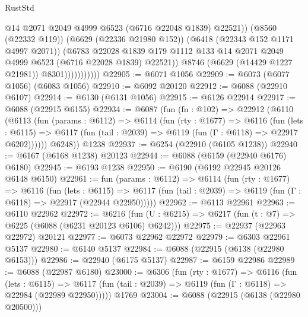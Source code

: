 \begin{lexlean}{RustStd}
\begin{coremodule}
                                @14
                                @2071
                                @2049
                                @4999
                                @6523
                                (@6716 @22048 @1839)
                                @22521))
                            (@8560 (@22332 @119))
                            (@6629 (@22336 @21980 @152))
                            (@6418 (@22343 @152 @1171 @4997 @2071))
                            (@6783
                              @22028
                              @1839
                              @179
                              @1112
                              @133
                              @14
                              @2071
                              @2049
                              @4999
                              @6523
                              (@6716 @22028 @1839)
                              @22521))
                          @8746
                          (@6629 (@14429 @1227 @21981))
                          @8301)))))))))))
@22905 := @6071 @1056
@22909 := @6073 (@6077 @1056) (@6083 @1056)
@22910 := @6092 @20120
@22912 := @6088 (@22910 @6107)
@22914 := @6130 (@6131 @1056)
@22915 := @6126 @22914
@22917 := @6088 (@22915 @6155)
@22934 := @6087
    (fun (fn : @102) =>
    @22912
      (@6110
        (@6113
          (fun (params : @6112) =>
          @6114
            (fun (rty : @1677) =>
            @6116
              (fun (lets : @6115) =>
              @6117 (fun (tail : @2039) => @6119 (fun (Γ : @6118) => @22917 @6202))))))
        @6248))
    @1238
@22937 := @6254 (@22910 (@6105 @1238))
@22940 := @6167 (@6168 @1238) @20123
@22944 := @6088 (@6159 (@22940 @6176) @6180)
@22945 := @6193 @1238
@22950 := @6190 (@6192 @22945 @20126 @6148 @6150)
@22961 := fun (params : @6112) =>
  @6114
    (fun (rty : @1677) =>
    @6116
      (fun (lets : @6115) =>
      @6117 (fun (tail : @2039) => @6119 (fun (Γ : @6118) => @22917 (@22944 @22950)))))
@22962 := @6113 @22961
@22963 := @6110 @22962
@22972 := @6216
    (fun (U : @6215) => @6217 (fun (t : @7) => @6225 (@6088 (@6231 @20123 @6106) @6242)))
@22975 := @22937 (@22963 @22972) @20121
@22977 := @6073 @22962 @22972
@22979 := @6303 @22961 @5137
@22980 := @6140 @5137
@22984 := @6088 (@22915 (@6138 (@22980 @6153)))
@22986 := @22940 (@6175 @5137)
@22987 := @6159 @22986
@22989 := @6088 (@22987 @6180)
@23000 := @6306
    (fun (rty : @1677) =>
    @6116
      (fun (lets : @6115) =>
      @6117 (fun (tail : @2039) => @6119 (fun (Γ : @6118) => @22984 (@22989 @22950)))))
    @1769
@23004 := @6088 (@22915 (@6138 (@22980 @20500)))

\end{coremodule}
\end{lexlean}
